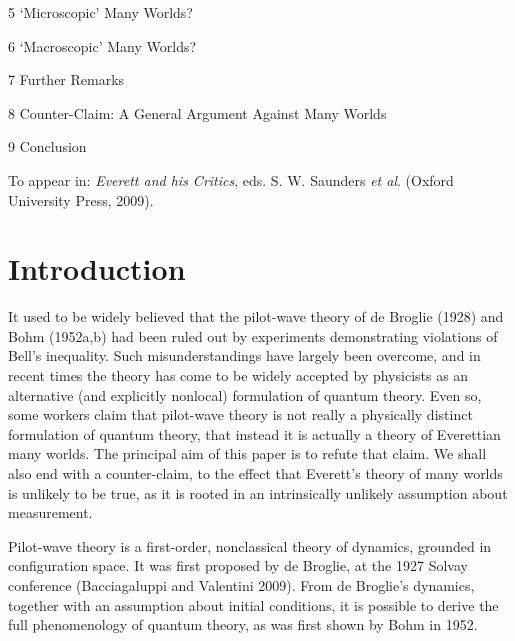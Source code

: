 \documentclass[12pt]{article}%
\begin{document}
5 `Microscopic' Many Worlds?

6 `Macroscopic' Many Worlds?

7 Further Remarks

8 Counter-Claim: A General Argument Against Many Worlds

9 Conclusion

\bigskip

\bigskip

To appear in: \textit{Everett and his Critics}, eds. S. W. Saunders \textit{et
al}. (Oxford University Press, 2009).

\bigskip

\bigskip

\bigskip

\bigskip

\bigskip

\bigskip

\bigskip

\bigskip

\bigskip

\bigskip

\bigskip

\bigskip

\bigskip\bigskip

\bigskip

\section{Introduction}

It used to be widely believed that the pilot-wave theory of de Broglie (1928)
and Bohm (1952a,b) had been ruled out by experiments demonstrating violations
of Bell's inequality. Such misunderstandings have largely been overcome, and
in recent times the theory has come to be widely accepted by physicists as an
alternative (and explicitly nonlocal) formulation of quantum theory. Even so,
some workers claim that pilot-wave theory is not really a physically distinct
formulation of quantum theory, that instead it is actually a theory of
Everettian many worlds. The principal aim of this paper is to refute that
claim. We shall also end with a counter-claim, to the effect that Everett's
theory of many worlds is unlikely to be true, as it is rooted in an
intrinsically unlikely assumption about measurement.

Pilot-wave theory is a first-order, nonclassical theory of dynamics, grounded
in configuration space. It was first proposed by de Broglie, at the 1927
Solvay conference (Bacciagaluppi and Valentini 2009). From de Broglie's
dynamics, together with an assumption about initial conditions, it is possible
to derive the full phenomenology of quantum theory, as was first shown by Bohm
in 1952.
\end{document}
